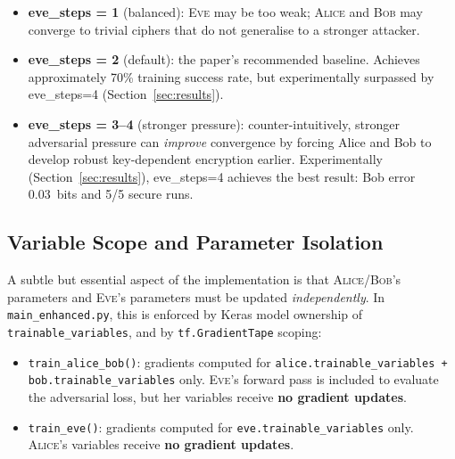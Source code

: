 \documentclass[12pt, a4paper]{article}
\newcommand{\alice}{\textsc{Alice}}
\newcommand{\bob}{\textsc{Bob}}
\newcommand{\eve}{\textsc{Eve}}
\newcommand{\code}[1]{\texttt{\color{CodeRed}#1}}
\begin{document}
\begin{tcolorbox}[contribbox, title={Effect of the Training Step Ratio}]
\begin{itemize}[leftmargin=1em, itemsep=3pt, label=$\bullet$]
  \item \textbf{eve\_steps = 1} (balanced): \eve{} may be too weak;
        \alice{} and \bob{} may converge to trivial ciphers that do
        not generalise to a stronger attacker.
  \item \textbf{eve\_steps = 2} (default): the paper's recommended baseline.
        Achieves approximately 70\% training success rate, but
        experimentally surpassed by eve\_steps=4 (Section~\ref{sec:results}).
  \item \textbf{eve\_steps = 3--4} (stronger pressure): counter-intuitively,
        stronger adversarial pressure can \emph{improve} convergence by
        forcing Alice and Bob to develop robust key-dependent encryption
        earlier. Experimentally (Section~\ref{sec:results}), eve\_steps=4
        achieves the best result: Bob error 0.03~bits and 5/5 secure runs.
\end{itemize}
\end{tcolorbox}

\subsection{Variable Scope and Parameter Isolation}
\label{subsec:var_scope}

A subtle but essential aspect of the implementation is that \alice{}/\bob{}'s
parameters and \eve{}'s parameters must be updated \emph{independently}.
In \code{main\_enhanced.py}, this is enforced by Keras model ownership of
\code{trainable\_variables}, and by \code{tf.GradientTape} scoping:

\begin{itemize}[leftmargin=1.8em, itemsep=4pt]
  \item \code{train\_alice\_bob()}: gradients computed for
        \code{alice.trainable\_variables + bob.trainable\_variables} only.
        \eve{}'s forward pass is included to evaluate the adversarial
        loss, but her variables receive \textbf{no gradient updates}.
  \item \code{train\_eve()}: gradients computed for
        \code{eve.trainable\_variables} only.
        \alice{}'s variables receive \textbf{no gradient updates}.
\end{itemize}
\end{document}
